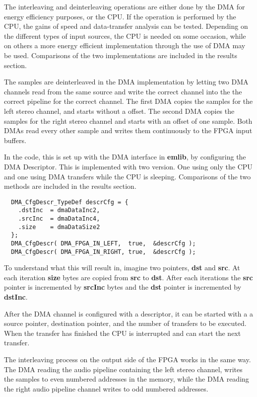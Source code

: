 The interleaving and deinterleaving operations are either done by the DMA for
energy efficiency purposes, or the CPU. If the operation is performed
by the CPU, the gains of speed and data-transfer analysis can be tested. Depending
on the different types of input sources, the CPU is needed on some occasion, while
on others a more energy efficient implementation through the use of DMA may be used.
Comparisons of the two implementations are included in the results section.

The samples are deinterleaved in the DMA implementation by letting two DMA channels read from the
same source and write the correct channel into the the correct pipeline for the correct channel.
The first DMA copies the samples for the left stereo channel, and starts without a offset. The
second DMA copies the samples for the right stereo channel and starts with an
offset of one sample. Both DMAs read every other sample and writes them
continuously to the FPGA input buffers.

In the code, this is set up with the DMA interface in {\bf emlib}, by configuring the DMA Descriptor.
This is implemented with two version. One using only the CPU and one using DMA transfers
while the CPU is sleeping. Comparisons of the two methods are included in the results section.

\begin{lstlisting}
  DMA_CfgDescr_TypeDef descrCfg = {
    .dstInc  = dmaDataInc2,
    .srcInc  = dmaDataInc4,
    .size    = dmaDataSize2
  };
  DMA_CfgDescr( DMA_FPGA_IN_LEFT,  true,  &descrCfg );
  DMA_CfgDescr( DMA_FPGA_IN_RIGHT, true,  &descrCfg );
\end{lstlisting}
To understand what this will result in, imagine two pointers, {\bf dst} and {\bf src}.
At each iteration {\bf size} bytes are copied from {\bf src} to {\bf dst}. After each
iterations the {\bf src} pointer is incremented by {\bf srcInc} bytes and the {\bf dst}
pointer is incremented by {\bf dstInc}.

After the DMA channel is configured with a descriptor, it can be started with a
a source pointer, destination pointer, and the number of transfers to be executed.
When the transfer has finished the CPU is interrupted and can start the next transfer.

The interleaving process on the output side of the FPGA works in the same way. The DMA reading
the audio pipeline containing the left stereo channel, writes the samples to even numbered
addresses in the memory, while the DMA reading the right audio pipeline channel writes
to odd numbered addresses.


